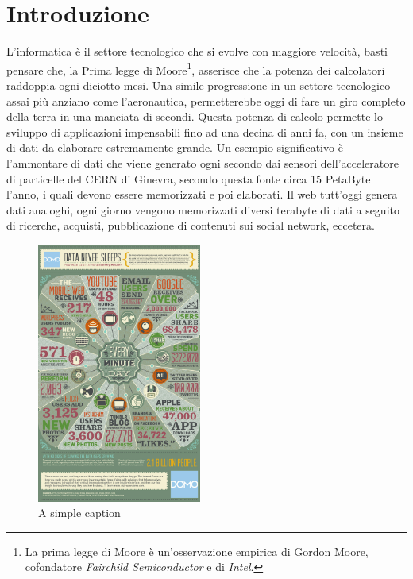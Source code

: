 
\chapter{Introduzione}
L'informatica è il settore tecnologico che si evolve con maggiore velocità, basti pensare che, la Prima legge di Moore\footnote{La prima legge di Moore è un'osservazione empirica di Gordon Moore, cofondatore \emph{Fairchild Semiconductor} e di \emph{Intel}.}, asserisce che la potenza dei calcolatori raddoppia ogni diciotto mesi. Una simile progressione in un settore tecnologico assai più anziano come l'aeronautica, permetterebbe oggi di fare un giro completo della terra in una manciata di secondi. Questa potenza di calcolo permette lo sviluppo di applicazioni impensabili fino ad una decina di anni fa, con un insieme di dati da elaborare estremamente grande. Un esempio significativo è l'ammontare di dati che viene generato ogni secondo dai sensori dell'acceleratore di particelle del CERN di Ginevra, secondo questa fonte \cite{pres_cern} circa 15 PetaByte l'anno, i quali devono essere memorizzati e poi elaborati. Il web tutt'oggi genera dati analoghi, ogni giorno vengono memorizzati diversi terabyte di dati a seguito di ricerche, acquisti, pubblicazione di contenuti sui social network, eccetera. 
\begin{figure}[r]
	\includegraphics[width=0.48\textwidth]{Data-in-One-Minute.jpg}
	\caption{A simple caption}
	\label{data_per_minute}
\end{figure}
